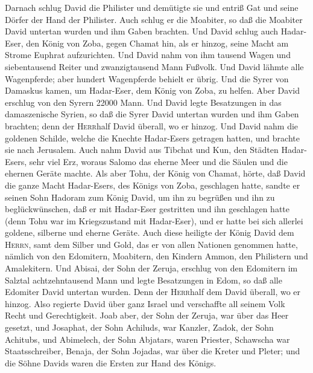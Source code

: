  Darnach schlug David die Philister und demütigte sie und
entriß Gat und seine Dörfer der Hand der Philister.  Auch
schlug er die Moabiter, so daß die Moabiter David untertan wurden und
ihm Gaben brachten.  Und David schlug auch Hadar-Eser, den
König von Zoba, gegen Chamat hin, als er hinzog, seine Macht am Strome
Euphrat aufzurichten.  Und David nahm von ihm tausend
Wagen und siebentausend Reiter und zwanzigtausend Mann Fußvolk. Und
David lähmte alle Wagenpferde; aber hundert Wagenpferde behielt er
übrig.  Und die Syrer von Damaskus kamen, um Hadar-Eser,
dem König von Zoba, zu helfen. Aber David erschlug von den Syrern 22000
Mann.  Und David legte Besatzungen in das damaszenische
Syrien, so daß die Syrer David untertan wurden und ihm Gaben brachten;
denn der \textsc{Herr}half David überall, wo er hinzog. 
Und David nahm die goldenen Schilde, welche die Knechte Hadar-Esers
getragen hatten, und brachte sie nach Jerusalem.  Auch
nahm David aus Tibchat und Kun, den Städten Hadar-Esers, sehr viel Erz,
woraus Salomo das eherne Meer und die Säulen und die ehernen Geräte
machte.  Als aber Tohu, der König von Chamat, hörte, daß
David die ganze Macht Hadar-Esers, des Königs von Zoba, geschlagen
hatte,  sandte er seinen Sohn Hadoram zum König David, um
ihn zu begrüßen und ihn zu beglückwünschen, daß er mit Hadar-Eser
gestritten und ihn geschlagen hatte (denn Tohu war im Kriegszustand mit
Hadar-Eser), und er hatte bei sich allerlei goldene, silberne und eherne
Geräte.  Auch diese heiligte der König David dem
\textsc{Herrn}, samt dem Silber und Gold, das er von allen Nationen
genommen hatte, nämlich von den Edomitern, Moabitern, den Kindern Ammon,
den Philistern und Amalekitern.  Und Abisai, der Sohn der
Zeruja, erschlug von den Edomitern im Salztal achtzehntausend Mann
 und legte Besatzungen in Edom, so daß alle Edomiter
David untertan wurden. Denn der \textsc{Herr}half dem David überall, wo
er hinzog.  Also regierte David über ganz Israel und
verschaffte all seinem Volk Recht und Gerechtigkeit. 
Joab aber, der Sohn der Zeruja, war über das Heer gesetzt, und Josaphat,
der Sohn Achiluds, war Kanzler,  Zadok, der Sohn
Achitubs, und Abimelech, der Sohn Abjatars, waren Priester, Schawscha
war Staatsschreiber,  Benaja, der Sohn Jojadas, war über
die Kreter und Pleter; und die Söhne Davids waren die Ersten zur Hand
des Königs.

